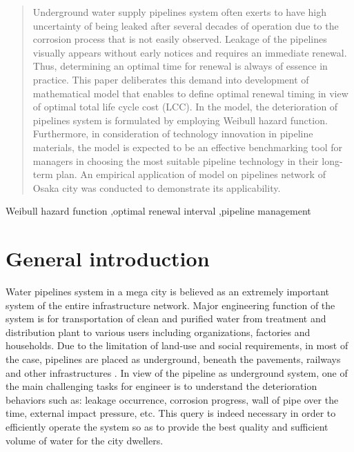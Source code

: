 \documentclass[a4paper,oneside,onecolumn,preprint,10pt,authoryear]{elsarticle}
\begin{document}
\begin{frontmatter}

\begin{abstract}
Underground water supply pipelines system often exerts to have high uncertainty of being leaked after several decades of operation due to the corrosion process that is not easily observed. Leakage of the pipelines visually appears without early notices and requires an immediate renewal. Thus, determining an optimal time for renewal is always of essence in practice. This paper deliberates this demand into development of mathematical model that enables to define optimal renewal timing in view of optimal total life cycle cost (LCC). In the model, the deterioration of pipelines system is formulated by employing Weibull hazard function. Furthermore, in consideration of technology innovation in pipeline materials, the model is expected to be an effective benchmarking tool for managers in choosing the most suitable pipeline technology in their long-term plan. An empirical application of model on pipelines network of Osaka city was conducted to demonstrate its applicability.
\end{abstract}

\begin{keyword}
Weibull hazard function \sep optimal renewal interval \sep pipeline management 



\end{keyword}

\end{frontmatter}


\section{General introduction}
\label{51}
Water pipelines system in a mega city is believed as an extremely important system of the entire infrastructure network. Major engineering function of the system is for transportation of clean and purified water from treatment and distribution plant to various users including organizations, factories and households. Due to the limitation of land-use and social requirements, in most of the case, pipelines are placed as underground, beneath the pavements, railways and other infrastructures \cite{ahammed97}. In view of the pipeline as underground system, one of the main challenging tasks for engineer is to understand the deterioration behaviors such as: leakage occurrence, corrosion progress, wall of pipe over the time, external impact pressure, etc. This query is indeed necessary in order to efficiently operate the system so as to provide the best quality and sufficient volume of water for the city dwellers.
\end{document}
